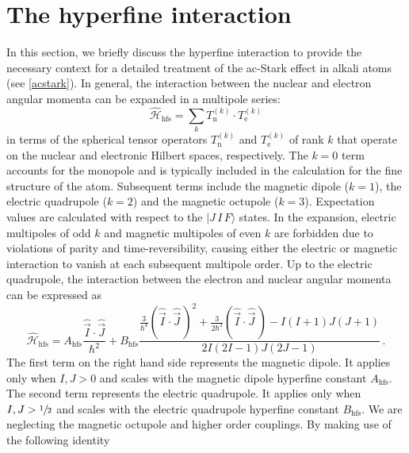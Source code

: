 \documentclass[../Thesis-IJspeert.tex]{subfiles}
\begin{document}
\section{The hyperfine interaction}
\label{hyperfineinteraction}
In this section, we briefly discuss the hyperfine interaction to provide the necessary context for a detailed treatment of the ac-Stark effect in alkali atoms (see \autoref{acstark}). In general, the interaction between the nuclear and electron angular momenta can be expanded in a multipole series:
\begin{equation}
\hat{\mathcal{H}}_{\mathrm{hfs}}=\sum_{k}T_\mathrm{n}^{(k)} \cdot T_\mathrm{e}^{(k)}
\end{equation}
in terms of the spherical tensor operators $T_\mathrm{n}^{(k)}$ and $T_\mathrm{e}^{(k)}$ of rank $k$ that operate on the nuclear and electronic Hilbert spaces, respectively. The $k = 0$ term accounts for the monopole and is typically included in the calculation for the fine structure of the atom. Subsequent terms include the magnetic dipole ($k=1$), the electric quadrupole ($k=2$) and the magnetic octupole ($k=3$). Expectation values are calculated with respect to the $|J\, I\, F\rangle$ states. In the expansion, electric multipoles of odd $k$ and magnetic multipoles of even $k$ are forbidden due to violations of parity and time-reversibility, causing either the electric or magnetic interaction to vanish at each subsequent multipole order. Up to the electric quadrupole, the interaction between the electron and nuclear angular momenta can be expressed as
\begin{equation}
\label{hyperfinehamiltonian}
\hat{\mathcal{H}}_{\mathrm{hfs}}=A_{\mathrm{hfs}} \frac{\hat{\vec{I}} \cdot \hat{\vec{J}}}{\hbar^2}+B_{\mathrm{hfs}} \frac{\frac{3}{\hbar^4} (\hat{\vec{I}} \cdot \hat{\vec{J}} \,)^2+\frac{3}{2 \hbar^2}(\hat{\vec{I}} \cdot \hat{\vec{J}}\,)-I(I+1) J(J+1)}{2 I(2 I-1) J(2 J-1)} \,.
\iffalse
+C_{\mathrm{hfs}} \frac{\frac{10}{\hbar^3}(\mathbf{I} \cdot \mathbf{J})^3+\frac{20}{\hbar^2}(\mathbf{I} \cdot \mathbf{J})^2+\frac{2}{\hbar}(\mathbf{I} \cdot \mathbf{J})[I(I+1)+J(J+1)+3-3 I(I+1) J(J+1)]-5 I(I+1) J(J+1)}{I(I-1)(2 I-1) J(J-1)(2 J-1)} .
\fi
\end{equation}
The first term on the right hand side represents the magnetic dipole. It applies only when $I, J>0$ and scales with the magnetic dipole hyperfine constant $A_{\mathrm{hfs}}$. The second term represents the electric quadrupole. It applies only when $I, J>\sfrac{1}{2}$ and scales with the electric quadrupole hyperfine constant $B_{\mathrm{hfs}}$. We are neglecting the magnetic octupole and higher order couplings. By making use of the following identity
\end{document}
